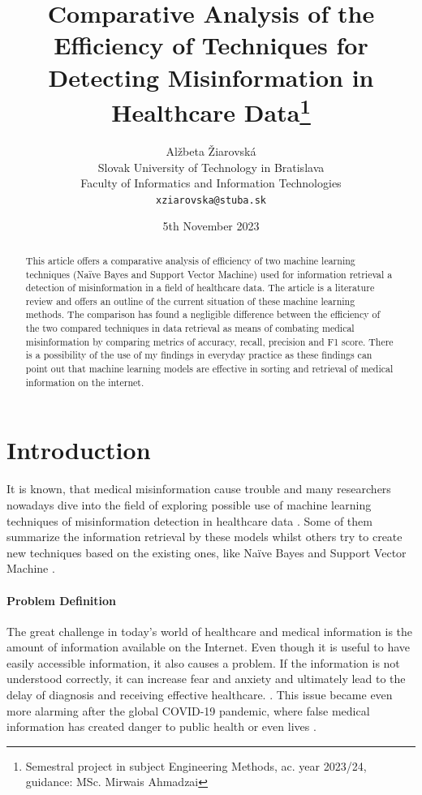 \documentclass[11pt ,english,a4paper]{article}
\title{Comparative Analysis of the Efficiency of Techniques for Detecting Misinformation in Healthcare Data\thanks{Semestral project in subject Engineering Methods, ac. year 2023/24, guidance: MSc. Mirwais Ahmadzai}}
\author{Alžbeta Žiarovská\\[2pt]
	{\small Slovak University of Technology in Bratislava}\\
	{\small Faculty of Informatics and Information Technologies}\\
	{\small \texttt{xziarovska@stuba.sk}}
	}
\date{\small 5th November 2023}
\begin{document}
\maketitle
\newpage

\begin{abstract}
This article offers a comparative analysis of efficiency of two machine learning techniques (Naïve Bayes and Support Vector Machine) used for information retrieval a detection of misinformation in a field of healthcare data. The article is a literature review and offers an outline of the current situation of these machine learning methods. The comparison has found a negligible difference between the efficiency of the two compared techniques in data retrieval as means of combating medical misinformation by comparing metrics of accuracy, recall, precision and F1 score. There is a possibility of the use of my findings in everyday practice as these findings can point out that machine learning models are effective in sorting and retrieval of medical information on the internet. 
\end{abstract}
\newpage

\section{Introduction}\label{intro}

It is known, that medical misinformation cause trouble \cite{wa19sys} and many researchers nowadays dive into the field of exploring possible use of machine learning techniques of misinformation detection in healthcare data \cite{bar21health}. Some of them summarize the information retrieval by these models whilst others try to create new techniques based on the existing ones, like Naïve Bayes and Support Vector Machine \cite{chap22unmask}.

\paragraph {Problem Definition} The great challenge in today's world of healthcare and medical information is the amount of information available on the Internet. Even though it is useful to have easily accessible information, it also causes a problem. If the information is not understood correctly, it can increase fear and anxiety and ultimately lead to the delay of diagnosis and receiving effective healthcare. \cite{wa19sys}. This issue became even more alarming after the global COVID-19 pandemic, where false medical information has created danger to public health or even lives \cite{war18dr}. 
\end{document}
